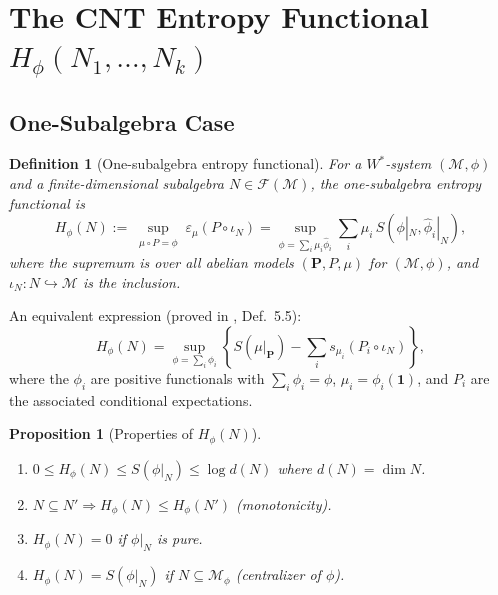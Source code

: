 \documentclass[12pt,a4paper]{article}
\newtheorem{proposition}[theorem]{Proposition}
\newtheorem{definition}[theorem]{Definition}
\newcommand{\id}{\mathbf{1}}  %
\newcommand{\vN}{\mathcal{M}}      %
\newcommand{\Hphi}{H_{\phi}}
\newcommand{\eps}{\varepsilon}
\begin{document}
\section{The CNT Entropy Functional $H_\phi(N_1,\ldots,N_k)$}
\label{sec:Hfunctional}

\subsection{One-Subalgebra Case}

\begin{definition}[One-subalgebra entropy functional]\label{def:H1}
For a $W^*$-system $(\vN,\phi)$ and a finite-dimensional subalgebra $N\in\mathcal{F}(\vN)$,
the \emph{one-subalgebra entropy functional} is
\begin{equation}\label{eq:H1}
  \Hphi(N) := \sup_{\substack{\mu\circ P=\phi}} \eps_\mu(P\circ\iota_N)
  = \sup_{\phi=\sum_i\mu_i\hat\phi_i}
    \sum_i \mu_i\, S(\phi|_N,\hat\phi_i|_N),
\end{equation}
where the supremum is over all abelian models $(\mathbf{P},P,\mu)$ for $(\vN,\phi)$,
and $\iota_N:N\hookrightarrow\vN$ is the inclusion.
\end{definition}

An equivalent expression (proved in \cite{cnt87}, Def.~5.5):
\begin{equation}\label{eq:H1_equiv}
  \Hphi(N) = \sup_{\phi=\sum_i\phi_i}
  \left\{S(\mu|_\mathbf{P}) - \sum_i s_{\mu_i}(P_i\circ\iota_N)\right\},
\end{equation}
where the $\phi_i$ are positive functionals with $\sum_i\phi_i=\phi$,
$\mu_i=\phi_i(\id)$, and $P_i$ are the associated conditional expectations.

\begin{proposition}[Properties of $\Hphi(N)$]\label{prop:H1_props}
\begin{enumerate}
\item[(a)] $0\le\Hphi(N)\le S(\phi|_N)\le\log d(N)$ where $d(N)=\dim N$.
\item[(b)] $N\subseteq N'\Rightarrow\Hphi(N)\le\Hphi(N')$ (monotonicity).
\item[(c)] $\Hphi(N)=0$ if $\phi|_N$ is pure.
\item[(d)] $\Hphi(N)=S(\phi|_N)$ if $N\subseteq\mathcal{M}_\phi$ (centralizer of $\phi$).
\end{enumerate}
\end{proposition}
\end{document}
